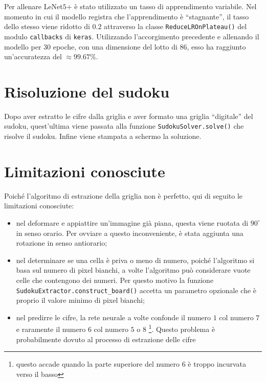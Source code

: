 \documentclass[a4paper, 10pt]{article}
\newcommand{\lenet}{LeNet\(5\)+}
\begin{document}
Per allenare \lenet{} è stato utilizzato un tasso di apprendimento variabile.
Nel momento in cui il modello registra che l'apprendimento è ``stagnante'', il
tasso dello stesso viene ridotto di \(0.2\) attraverso la classe
\texttt{ReduceLROnPlateau()} del modulo \texttt{callbacks}
di \texttt{keras}.
Utilizzando l'accorgimento precedente e allenando il modello per \(30\) epoche,
con una dimensione del lotto di \(86\), esso ha raggiunto un'accuratezza del
\(\approx 99.67\%\).

\section{Risoluzione del sudoku}

Dopo aver estratto le cifre dalla griglia e aver formato una griglia
``digitale'' del sudoku, quest'ultima viene passata alla funzione
\texttt{SudokuSolver.solve()} che risolve il sudoku. Infine viene
stampata a schermo la soluzione.

\section{Limitazioni conosciute}

Poiché l'algoritmo di estrazione della griglia non è perfetto, qui di seguito le
limitazioni conosciute:

\begin{itemize}
    \item nel deformare e appiattire un'immagine già piana, questa viene
        ruotata di \(90^\circ\) in senso orario. Per ovviare a questo
        inconveniente, è stata aggiunta una rotazione in senso antiorario;
    \item nel determinare se una cella è priva o meno di numero, poiché
        l'algoritmo si basa sul numero di pixel bianchi, a volte l'algoritmo
        può considerare vuote celle che contengono dei numeri. Per questo
        motivo la funzione \texttt{SudokuExtractor.construct_board()}
        accetta un parametro opzionale che è proprio il valore minimo di pixel
        bianchi;
    \item nel predirre le cifre, la rete neurale a volte confonde il numero
    \(1\) col numero \(7\) e raramente il numero \(6\) col numero \(5\) o \(8\)
    \footnote{questo accade quando la parte superiore del numero \(6\) è troppo
    incurvata verso il basso}. Questo problema è probabilmente dovuto al
    processo di estrazione delle cifre
\end{itemize}


\bigskip
\printbibliography
\end{document}
